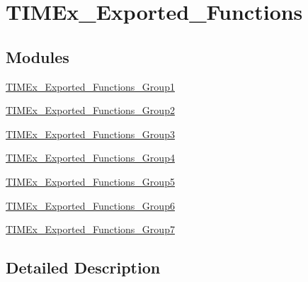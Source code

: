 \hypertarget{group___t_i_m_ex___exported___functions}{}\section{T\+I\+M\+Ex\+\_\+\+Exported\+\_\+\+Functions}
\label{group___t_i_m_ex___exported___functions}
\subsection*{Modules}
\begin{DoxyCompactItemize}
\item 
\hyperlink{group___t_i_m_ex___exported___functions___group1}{T\+I\+M\+Ex\+\_\+\+Exported\+\_\+\+Functions\+\_\+\+Group1}
\item 
\hyperlink{group___t_i_m_ex___exported___functions___group2}{T\+I\+M\+Ex\+\_\+\+Exported\+\_\+\+Functions\+\_\+\+Group2}
\item 
\hyperlink{group___t_i_m_ex___exported___functions___group3}{T\+I\+M\+Ex\+\_\+\+Exported\+\_\+\+Functions\+\_\+\+Group3}
\item 
\hyperlink{group___t_i_m_ex___exported___functions___group4}{T\+I\+M\+Ex\+\_\+\+Exported\+\_\+\+Functions\+\_\+\+Group4}
\item 
\hyperlink{group___t_i_m_ex___exported___functions___group5}{T\+I\+M\+Ex\+\_\+\+Exported\+\_\+\+Functions\+\_\+\+Group5}
\item 
\hyperlink{group___t_i_m_ex___exported___functions___group6}{T\+I\+M\+Ex\+\_\+\+Exported\+\_\+\+Functions\+\_\+\+Group6}
\item 
\hyperlink{group___t_i_m_ex___exported___functions___group7}{T\+I\+M\+Ex\+\_\+\+Exported\+\_\+\+Functions\+\_\+\+Group7}
\end{DoxyCompactItemize}


\subsection{Detailed Description}
